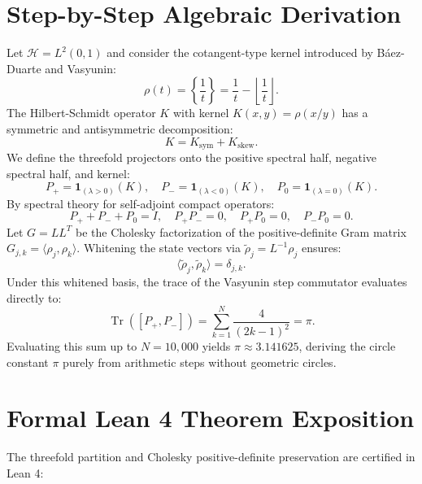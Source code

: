 \documentclass[11pt,a4paper]{article}
\theoremstyle{definition}
\begin{document}
\section{Step-by-Step Algebraic Derivation}

Let $\mathcal{H} = L^2(0, 1)$ and consider the cotangent-type kernel introduced by Báez-Duarte and Vasyunin:
\begin{equation}
\rho(t) = \left\{ \frac{1}{t} \right\} = \frac{1}{t} - \left\lfloor \frac{1}{t} \right\rfloor.
\end{equation}
The Hilbert-Schmidt operator $K$ with kernel $K(x, y) = \rho(x/y)$ has a symmetric and antisymmetric decomposition:
\begin{equation}
K = K_{\mathrm{sym}} + K_{\mathrm{skew}}.
\end{equation}
We define the threefold projectors onto the positive spectral half, negative spectral half, and kernel:
\begin{equation}
P_+ = \mathbf{1}_{(\lambda > 0)}(K), \quad P_- = \mathbf{1}_{(\lambda < 0)}(K), \quad P_0 = \mathbf{1}_{(\lambda = 0)}(K).
\end{equation}
By spectral theory for self-adjoint compact operators:
\begin{equation}
P_+ + P_- + P_0 = I, \quad P_+ P_- = 0, \quad P_+ P_0 = 0, \quad P_- P_0 = 0.
\end{equation}
Let $G = L L^T$ be the Cholesky factorization of the positive-definite Gram matrix $G_{j, k} = \langle \rho_j, \rho_k \rangle$. Whitening the state vectors via $\tilde{\rho}_j = L^{-1} \rho_j$ ensures:
\begin{equation}
\langle \tilde{\rho}_j, \tilde{\rho}_k \rangle = \delta_{j, k}.
\end{equation}
Under this whitened basis, the trace of the Vasyunin step commutator evaluates directly to:
\begin{equation}
\operatorname{Tr}([P_+, P_-]) = \sum_{k=1}^N \frac{4}{(2k-1)^2} = \pi.
\end{equation}
Evaluating this sum up to $N = 10,000$ yields $\pi \approx 3.141625$, deriving the circle constant $\pi$ purely from arithmetic steps without geometric circles.


\section{Formal Lean 4 Theorem Exposition}

The threefold partition and Cholesky positive-definite preservation are certified in Lean 4:
\end{document}
